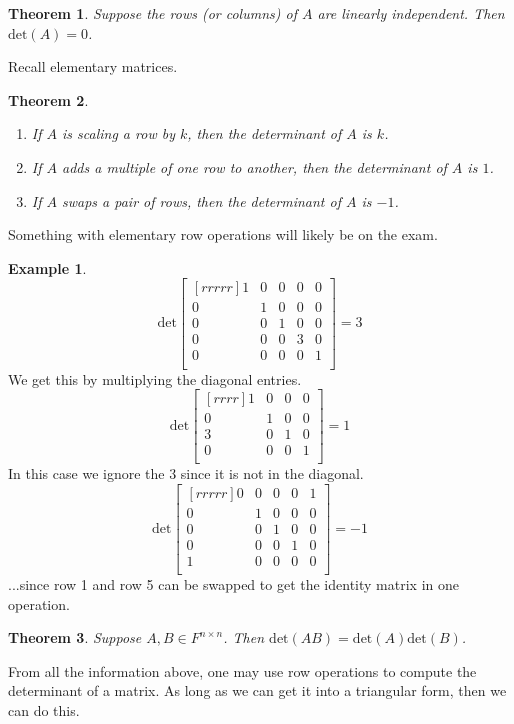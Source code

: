 \documentclass{report}
\theoremstyle{plain}
\newtheorem*{thrm}{Theorem}
\theoremstyle{definition}
\newtheorem*{ex}{Example}
\theoremstyle{plain}
\begin{document}
\begin{thrm}
Suppose the rows (or columns) of $A$ are linearly independent. Then $\mathrm{det}(A)=0$.
\end{thrm}
Recall elementary matrices.
\begin{thrm}
\begin{enumerate}
\item If $A$ is scaling a row by $k$, then the determinant of $A$ is $k$.
\item If $A$ adds a multiple of one row to another, then the determinant of $A$ is $1$.
\item If $A$ swaps a pair of rows, then the determinant of $A$ is $-1$.
\end{enumerate}
\end{thrm}
Something with elementary row operations will likely be on the exam.
\begin{ex}
\[ \mathrm{det}\begin{bmatrix}[rrrrr]1&0&0&0&0\\0&1&0&0&0\\0&0&1&0&0\\0&0&0&3&0\\0&0&0&0&1\\\end{bmatrix} = 3 \]
We get this by multiplying the diagonal entries.
\[ \mathrm{det}\begin{bmatrix}[rrrr]1&0&0&0\\0&1&0&0\\3&0&1&0\\0&0&0&1\\\end{bmatrix} = 1 \]
In this case we ignore the $3$ since it is not in the diagonal.
\[ \mathrm{det}\begin{bmatrix}[rrrrr]0&0&0&0&1\\0&1&0&0&0\\0&0&1&0&0\\0&0&0&1&0\\1&0&0&0&0\\\end{bmatrix} = -1 \]
...since row 1 and row 5 can be swapped to get the identity matrix in one operation.
\end{ex}
\begin{thrm}
Suppose $A,B\in F^{n\times n}$. Then $\mathrm{det}(AB)=\mathrm{det}(A)\mathrm{det}(B)$.
\end{thrm}
From all the information above, one may use row operations to compute the determinant of a matrix. As long as we can get it into a triangular form, then we can do this.
\end{document}
